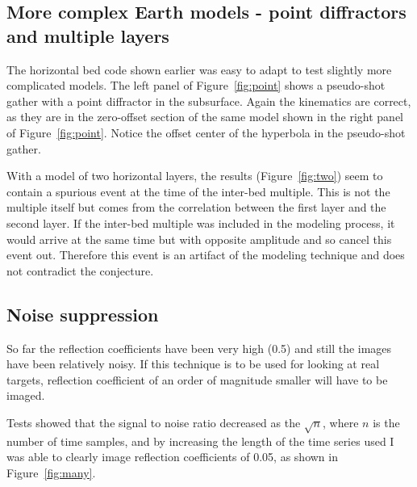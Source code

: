 \subsection{More complex Earth models - point diffractors and multiple layers}

The horizontal bed code shown earlier was easy to adapt to test 
slightly more complicated models.
The left panel of Figure~\ref{fig:point} shows a pseudo-shot gather 
with a point diffractor in the subsurface. Again the kinematics are correct, 
as they are in the zero-offset section of the same model shown in the 
right panel of Figure~\ref{fig:point}.  Notice the offset center of the 
hyperbola in the pseudo-shot gather.


With a model of two horizontal layers, the results (Figure~\ref{fig:two}) 
seem to contain a 
spurious event at the time of the inter-bed multiple. This is not the multiple 
itself but comes from the correlation between the first layer and the
second layer.  If the inter-bed multiple was included in the modeling process, 
it would arrive at the same time but with opposite amplitude and so 
cancel this event out. Therefore this event is an artifact of the modeling 
technique and does not contradict the conjecture.


\subsection{Noise suppression}

So far the reflection coefficients have been very high (0.5) and still the 
images have been relatively noisy. If this 
technique is to be used for looking at real targets, reflection coefficient 
of an order of magnitude smaller will have to be imaged.

Tests showed that the signal to noise ratio decreased as the $\sqrt{n}$, 
where $n$ is the number of time samples, and by increasing the length 
of the time series used I was able to clearly image reflection coefficients
of 0.05, as shown in Figure~\ref{fig:many}.


